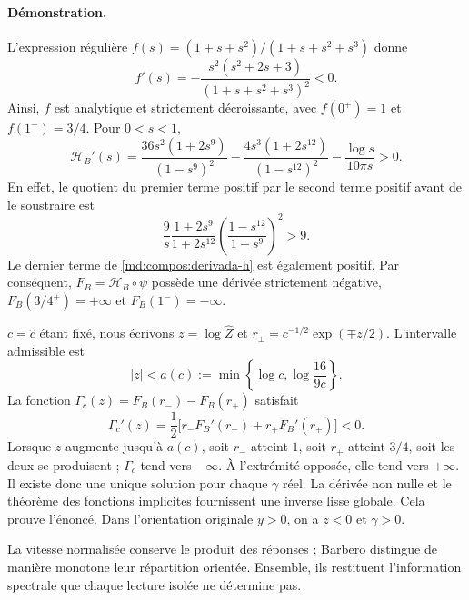 \paragraph{Démonstration.}
L’expression régulière
$f(s)=(1+s+s^2)/(1+s+s^2+s^3)$ donne
\begin{equation}
 f'(s)=-\frac{s^2(s^2+2s+3)}{(1+s+s^2+s^3)^2}<0.
 \label{md:compos:derivada-f}
\end{equation}
Ainsi, $f$ est analytique et strictement décroissante, avec $f(0^+)=1$ et
$f(1^-)=3/4$. Pour $0<s<1$,
\begin{equation}
 \mathcal H_B'(s)=
 \frac{36s^2(1+2s^9)}{(1-s^9)^2}
 -\frac{4s^3(1+2s^{12})}{(1-s^{12})^2}
 -\frac{\log s}{10\pi s}>0.
 \label{md:compos:derivada-h}
\end{equation}
En effet, le quotient du premier terme positif par le second terme
positif avant de le soustraire est
\begin{equation}
 \frac{9}{s}\frac{1+2s^9}{1+2s^{12}}
 \left(\frac{1-s^{12}}{1-s^9}\right)^2>9.
 \label{md:compos:cota-derivada-h}
\end{equation}
Le dernier terme de \eqref{md:compos:derivada-h} est également positif.
Par conséquent, $F_B=\mathcal H_B\circ\psi$ possède une dérivée strictement négative,
$F_B(3/4^+)=+\infty$ et $F_B(1^-)=-\infty$.

$c=\widehat c$ étant fixé, nous écrivons $z=\log\widehat Z$ et
$r_\pm=c^{-1/2}\exp(\mp z/2)$. L’intervalle admissible est
\begin{equation}
 |z|<a(c):=\min\left\{\log c,\log\frac{16}{9c}\right\}.
 \label{md:compos:dominio-z}
\end{equation}
La fonction $\Gamma_c(z)=F_B(r_-)-F_B(r_+)$ satisfait
\begin{equation}
 \Gamma_c'(z)=\frac12
 \bigl[r_-F_B'(r_-)+r_+F_B'(r_+)\bigr]<0.
 \label{md:compos:derivada-gamma}
\end{equation}
Lorsque $z$ augmente jusqu’à $a(c)$, soit $r_-$ atteint $1$, soit $r_+$ atteint $3/4$,
soit les deux se produisent ; $\Gamma_c$ tend vers $-\infty$. À l’extrémité opposée,
elle tend vers $+\infty$. Il existe donc une unique solution pour chaque $\gamma$
réel. La dérivée non nulle et le théorème des fonctions implicites fournissent
une inverse lisse globale. Cela prouve l’énoncé. Dans l’orientation
originale $y>0$, on a $z<0$ et $\gamma>0$.

La vitesse normalisée conserve le produit des réponses ; Barbero
distingue de manière monotone leur répartition orientée. Ensemble,
ils restituent l’information spectrale que chaque lecture isolée ne détermine pas.


